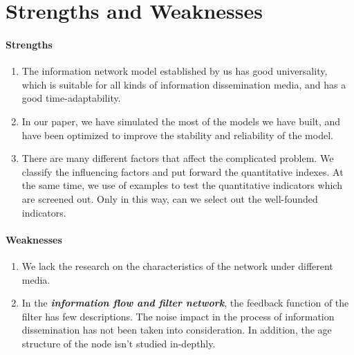 \documentclass[a4paper,11pt]{article}
\begin{document}
\section{Strengths and Weaknesses}

\paragraph{Strengths}
\text{\\}
\begin{enumerate}%
\renewcommand{\labelenumi}{(\theenumi)}
    \item The information network model established by us has good universality, which is suitable for all kinds of information dissemination media, and has a good time-adaptability.
    \item In our paper, we have simulated the most of the models we have built, and have been optimized to improve the stability and reliability of the model.
    \item There are many different factors that affect the complicated problem. We classify the influencing factors and put forward the quantitative indexes. At the same time, we use of examples to test the quantitative indicators which are screened out. Only in this way, can we select out the well-founded indicators.
\end{enumerate}


\paragraph{Weaknesses}
\begin{enumerate}%
\renewcommand{\labelenumi}{(\theenumi)}
    \item We lack the research on the characteristics of the network under different media.
    \item In the \emph{\textbf{information flow and filter network}}, the feedback function of the filter has few descriptions. The noise impact in the process of information dissemination has not been taken into consideration. In addition, the age structure of the node isn't studied in-depthly.
\end{enumerate}
\end{document}
